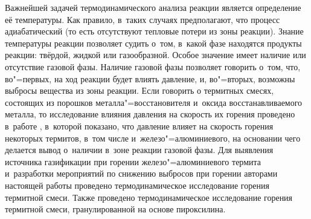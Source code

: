 


\date{22/III/2011}


\maketitle


Важнейшей задачей термодинамического анализа реакции является определение её температуры. 
Как правило, в~таких случаях предполагают, что процесс адиабатический (то есть отсутствуют тепловые потери из зоны реакции). Знание температуры реакции позволяет судить о~том, в~какой фазе находятся продукты реакции: твёрдой, жидкой или газообразной. Особое значение имеет наличие или отсутствие газовой фазы. 
Наличие газовой фазы позволяет говорить о~том, что, во"=первых, на ход реакции будет влиять давление, и, во"=вторых, возможны выбросы вещества из зоны реакции. 
Если говорить о термитных смесях, состоящих из порошков металла"=восстановителя и~оксида восстанавливаемого металла, то исследование влияния давления на скорость их горения проведено в~работе \cite{yatc11:bib1}, в~которой показано, что давление влияет на скорость горения некоторых термитов, в~том числе и~железо"=алюминиевого, на основании чего делается вывод о~наличии в~зоне реакции газовой фазы. 
Для выявления источника газификации при горении железо"=алюминиевого термита и~разработки мероприятий по снижению выбросов при горении авторами настоящей работы проведено термодинамическое исследование горения термитной смеси. 
Также проведено термодинамическое исследование горения термитной смеси, гранулированной на основе пироксилина.


